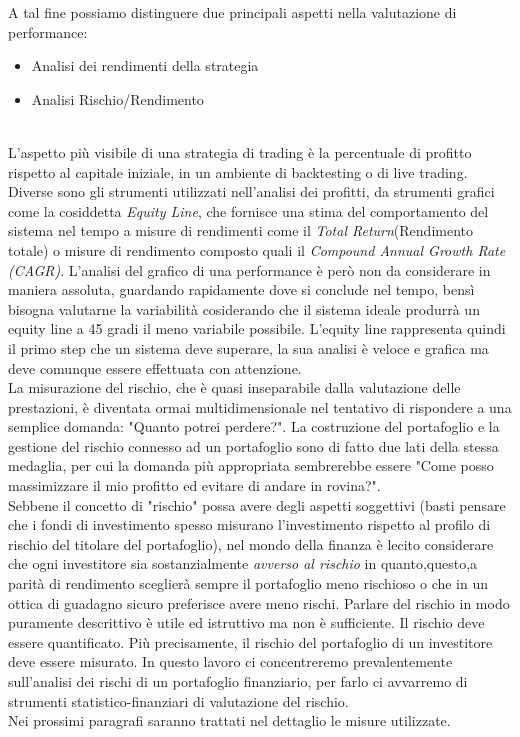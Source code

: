 \documentclass[]{article}
\begin{document}
A tal fine possiamo distinguere due principali aspetti nella valutazione di performance:

\begin{itemize}
	\item Analisi dei rendimenti della strategia
	\item Analisi Rischio/Rendimento
\end{itemize}
\
\\
L’aspetto più visibile di una strategia di trading  è la percentuale di profitto rispetto al capitale iniziale, in un ambiente di backtesting o di live trading. Diverse sono gli strumenti utilizzati nell'analisi dei profitti, da strumenti grafici come la cosiddetta \textit{Equity Line}, che fornisce una stima del comportamento del sistema nel tempo a misure di rendimenti come il \textit{Total Return}(Rendimento totale) o misure di rendimento composto quali il \textit{Compound Annual Growth Rate (CAGR)}.
L'analisi del grafico di una performance è però non da considerare in maniera assoluta,  guardando rapidamente dove si conclude
nel tempo, bensì  bisogna valutarne la variabilità cosiderando che il sistema
ideale produrrà un equity line a 45 gradi il meno variabile possibile.
L’equity line rappresenta quindi il primo step che un sistema deve superare,
la sua analisi è veloce e grafica ma deve comunque essere effettuata con
attenzione.
\\
La misurazione del rischio, che è quasi inseparabile dalla
valutazione delle prestazioni, è diventata ormai multidimensionale nel tentativo di rispondere a  una semplice domanda: "Quanto potrei perdere?".
La costruzione del portafoglio e la gestione del rischio connesso ad un portafoglio sono di fatto due lati della stessa medaglia, per cui la domanda più appropriata sembrerebbe essere
"Come posso massimizzare il mio profitto ed evitare di andare in rovina?".
\\
Sebbene il concetto di "rischio" possa avere degli aspetti soggettivi (basti pensare che i fondi di investimento spesso misurano l'investimento rispetto al profilo di rischio del titolare del portafoglio), nel mondo della finanza è lecito considerare che ogni investitore sia sostanzialmente \textit{avverso al rischio} in quanto,questo,a parità di rendimento  sceglierà sempre il portafoglio meno rischioso o che in un ottica di guadagno sicuro preferisce avere meno rischi.
Parlare del rischio in modo puramente descrittivo è utile ed istruttivo ma non è sufficiente. Il rischio deve essere quantificato. Più precisamente, il rischio del portafoglio di un investitore deve essere misurato.
In questo lavoro ci concentreremo prevalentemente sull'analisi dei rischi di un portafoglio finanziario, per farlo ci avvarremo di strumenti statistico-finanziari di valutazione del rischio.
\\
Nei prossimi paragrafi saranno trattati nel dettaglio le misure utilizzate.
\end{document}
